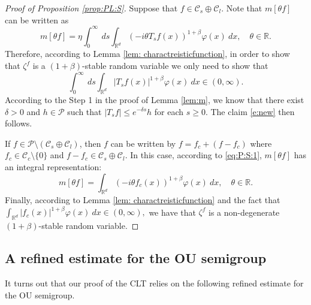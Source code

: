 \documentclass[EJP]{ejpecp} %
\begin{document}
\begin{proof}[Proof of Proposition \ref{prop:PL:S}]
	Suppose that $f\in \mathcal C_s \oplus \mathcal C_l$.
	Note that $m[\theta f]$ can be written as
\begin{equation}
    \label{eq:PL:S:1}
    m[\theta f]
    = \eta \int_0^{\infty}~ds\int_{\mathbb R^d} (-i\theta T_s f(x))^{1+\beta} \varphi(x)~dx,
    \quad \theta \in \mathbb R.
\end{equation}
	Therefore, according to Lemma \ref{lem: charactreisticfunction}, in order to show that $\zeta^f$ is a $(1+\beta)$-stable random variable we only need to show that
\begin{equation}\label{e:new}
    \int_0^{\infty}~ds\int_{\mathbb R^d} | T_{s} f(x)|^{1+\beta} \varphi(x)~dx
    \in (0, \infty).
\end{equation}
	According to the Step 1 in the proof of Lemma \ref{lem:m}, we know that there exist $\delta> 0$ and $h \in \mathcal P$ such that $|T_sf| \leq e^{- \delta s} h$ for each $s\geq 0$.
	The claim \eqref{e:new} then follows.

	If $f \in \mathcal P \setminus (\mathcal C_s \oplus \mathcal C_l)$, then $f$ can be written by $f = f_c +(f - f_c)$ where $f_c \in \mathcal C_c\setminus\{0\}$ and $f - f_c \in \mathcal C_s \oplus \mathcal C_l$.
	In this case, according to \eqref{eq:P:S:1}, $m[\theta f]$ has an integral representation:
\begin{equation}  
\label{eq:PL:S:2}
    m[\theta f]
    = \int_{\mathbb R^d} (-i\theta f_c(x))^{1+\beta} \varphi(x) ~dx,
    \quad \theta \in \mathbb R.
\end{equation}
	Finally, according to Lemma \ref{lem: charactreisticfunction} and the fact that $\int_{\mathbb R^d} | f_c(x)|^{1+\beta} \varphi(x)~dx \in (0, \infty),$ 
	we have that $\zeta^f$ is a non-degenerate $(1+\beta)$-stable random variable.
\end{proof}

\subsection{A refined estimate for the OU semigroup}\label{sc:refined}
	It turns out that our proof of the CLT relies on the following refined estimate for the OU semigroup.
\end{document}
